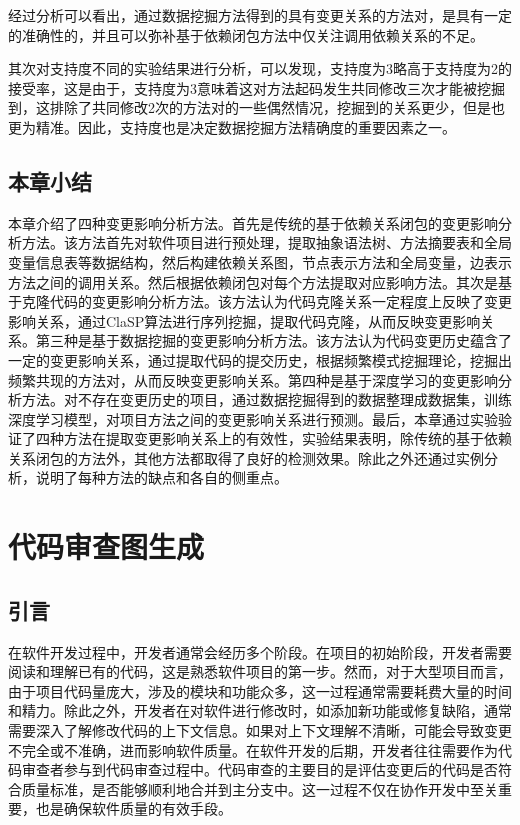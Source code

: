 经过分析可以看出，通过数据挖掘方法得到的具有变更关系的方法对，是具有一定的准确性的，并且可以弥补基于依赖闭包方法中仅关注调用依赖关系的不足。

其次对支持度不同的实验结果进行分析，可以发现，支持度为3略高于支持度为2的接受率，这是由于，支持度为3意味着这对方法起码发生共同修改三次才能被挖掘到，这排除了共同修改2次的方法对的一些偶然情况，挖掘到的关系更少，但是也更为精准。因此，支持度也是决定数据挖掘方法精确度的重要因素之一。

\section{本章小结}

本章介绍了四种变更影响分析方法。首先是传统的基于依赖关系闭包的变更影响分析方法。该方法首先对软件项目进行预处理，提取抽象语法树、方法摘要表和全局变量信息表等数据结构，然后构建依赖关系图，节点表示方法和全局变量，边表示方法之间的调用关系。然后根据依赖闭包对每个方法提取对应影响方法。其次是基于克隆代码的变更影响分析方法。该方法认为代码克隆关系一定程度上反映了变更影响关系，通过ClaSP算法进行序列挖掘，提取代码克隆，从而反映变更影响关系。第三种是基于数据挖掘的变更影响分析方法。该方法认为代码变更历史蕴含了一定的变更影响关系，通过提取代码的提交历史，根据频繁模式挖掘理论，挖掘出频繁共现的方法对，从而反映变更影响关系。第四种是基于深度学习的变更影响分析方法。对不存在变更历史的项目，通过数据挖掘得到的数据整理成数据集，训练深度学习模型，对项目方法之间的变更影响关系进行预测。最后，本章通过实验验证了四种方法在提取变更影响关系上的有效性，实验结果表明，除传统的基于依赖关系闭包的方法外，其他方法都取得了良好的检测效果。除此之外还通过实例分析，说明了每种方法的缺点和各自的侧重点。



\chapter{代码审查图生成}
\section{引言}


在软件开发过程中，开发者通常会经历多个阶段。在项目的初始阶段，开发者需要阅读和理解已有的代码，这是熟悉软件项目的第一步。然而，对于大型项目而言，由于项目代码量庞大，涉及的模块和功能众多，这一过程通常需要耗费大量的时间和精力。除此之外，开发者在对软件进行修改时，如添加新功能或修复缺陷，通常需要深入了解修改代码的上下文信息。如果对上下文理解不清晰，可能会导致变更不完全或不准确，进而影响软件质量。在软件开发的后期，开发者往往需要作为代码审查者参与到代码审查过程中。代码审查的主要目的是评估变更后的代码是否符合质量标准，是否能够顺利地合并到主分支中。这一过程不仅在协作开发中至关重要，也是确保软件质量的有效手段。

